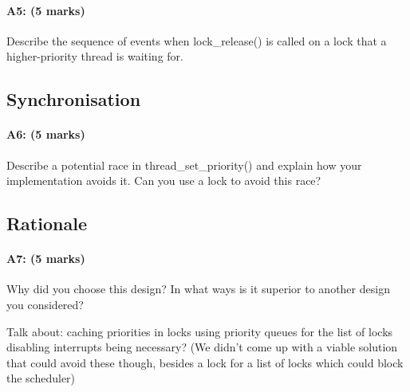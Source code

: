 \paragraph{A5: (5 marks)}
Describe the sequence of events when lock\_release() is called on a lock that a higher-priority thread is waiting for.

\subsection{Synchronisation}
\paragraph{A6: (5 marks)}
Describe a potential race in thread\_set\_priority() and explain how your implementation avoids it.  Can you use a lock to avoid this race?

\subsection{Rationale}
\paragraph{A7: (5 marks)}
Why did you choose this design?  In what ways is it superior to another design you considered?

Talk about:
	caching priorities in locks
	using priority queues for the list of locks
	disabling interrupts being necessary? (We didn't come up with a viable solution that could avoid these though, besides a lock for a list of locks which could block the scheduler)
